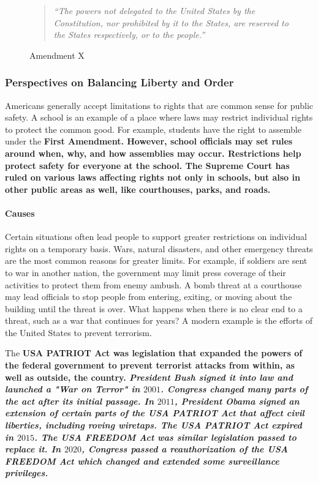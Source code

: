 \begin{figure}[h]
    \begin{quote}
        \it{“The powers not delegated to the United States by the Constitution, nor prohibited by it to the States, are reserved to the States respectively, or to the people.”}
    \end{quote}
    \caption{Amendment X}
\end{figure}

\subsubsection*{Perspectives on Balancing Liberty and Order}

Americans generally accept limitations to rights that are common sense for public safety. A school is an example of a place where laws may restrict individual rights to protect the common good. For example, students have the right to assemble under the \bf{First Amendment}. However, school officials may set rules around when, why, and how assemblies may occur. Restrictions help protect safety for everyone at the school. The \bf{Supreme Court} has ruled on various laws affecting rights not only in schools, but also in other public areas as well, like courthouses, parks, and roads.

\paragraph{Causes} Certain situations often lead people to support greater restrictions on individual rights on a temporary basis. Wars, natural disasters, and other emergency threats are the most common reasons for greater limits. For example, if soldiers are sent to war in another nation, the government may limit press coverage of their activities to protect them from enemy ambush. A bomb threat at a courthouse may lead officials to stop people from entering, exiting, or moving about the building until the threat is over. What happens when there is no clear end to a threat, such as a war that continues for years? A modern example is the efforts of the United States to prevent terrorism.

The \bf{USA PATRIOT} Act was legislation that expanded the powers of the federal government to prevent terrorist attacks from within, as well as outside, the country. \it{President Bush} signed it into law and launched a \it{"War on Terror"} in $2001$. Congress changed many parts of the act after its initial passage. In $2011$, \it{President Obama} signed an extension of certain parts of the \bf{USA PATRIOT Act} that affect civil liberties, including roving wiretaps. The \bf{USA PATRIOT Act} expired in $2015$. The \bf{USA FREEDOM Act} was similar legislation passed to replace it. In $2020$, Congress passed a reauthorization of the \bf{USA FREEDOM Act} which changed and extended some surveillance privileges.

